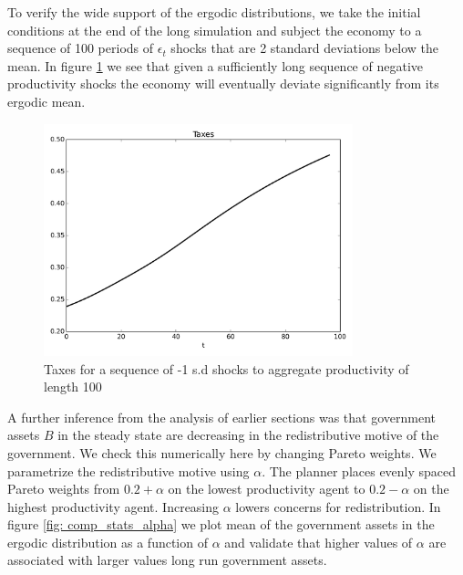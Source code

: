 \documentclass[thmsb,11pt]{article}
\begin{document}
To verify the wide support of the ergodic distributions,
we take the initial conditions at the end of the long simulation and subject the economy to a sequence of 100 periods of $\epsilon_t$ shocks that  are 2 standard deviations below the mean.  In figure \ref{fig: wide support of taxes} we see that given a sufficiently long sequence of negative productivity  shocks the economy will eventually deviate significantly from its ergodic mean.


{
  \begin{figure}
    \centering
    \includegraphics[width = 0.8\textwidth]{cesplots/taxes_only_bad_shocks.png}
    \caption{Taxes for a sequence of -1 s.d shocks to aggregate productivity of length 100}
      \label{fig: wide support of taxes}
  \end{figure}

}

A further inference from the analysis of earlier sections was that government assets $B$  in the steady state are decreasing in the redistributive motive of the government.
We check this numerically here  by changing  Pareto weights.
We parametrize the redistributive motive using  $\alpha$.  The planner places evenly spaced Pareto weights from $0.2+\alpha$
on the lowest productivity agent to $0.2-\alpha$ on the highest productivity agent. Increasing $\alpha$ lowers concerns for redistribution.
In figure \ref{fig: comp_stats_alpha} we plot mean of the government assets in the ergodic distribution as a function of $\alpha$ and validate that higher values of $\alpha$ are associated with larger values long run government assets.
\end{document}
